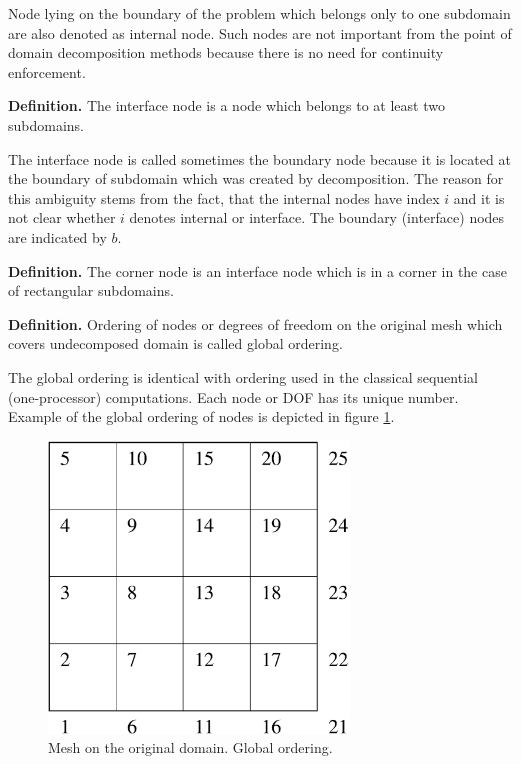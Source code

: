 Node lying on the boundary of the problem which belongs only to one subdomain are also denoted as internal
node. Such nodes are not important from the point of domain decomposition methods because there is no need
for continuity enforcement.

\noindent
{\bf Definition.}
The interface node  is a node which belongs to at least two subdomains.

The interface node is called sometimes the boundary node 
because it is located at the boundary of subdomain which was created by decomposition.
The reason for this ambiguity stems from the fact, that
the internal nodes have index $i$ and it is not clear whether $i$ denotes internal or interface. The boundary
(interface) nodes are indicated by $b$.

\noindent
{\bf Definition.}
The corner node  is an interface node which is in a corner in the case
of rectangular subdomains.




\noindent
{\bf Definition.}
Ordering of nodes or degrees of freedom on the original mesh which covers undecomposed domain is called
global  ordering.

\noindent
The global ordering is identical with ordering used in the classical sequential (one-processor) computations.
Each node or DOF has its unique number. Example of the global ordering of nodes is depicted in figure \ref{figmeshglobord}.

\begin{figure}[h]
\begin{center}
\includegraphics[width=80mm]{FIG/meshglobord.eps}
\caption{Mesh on the original domain. Global ordering.}
\label{figmeshglobord}
\end{center}
\end{figure}

